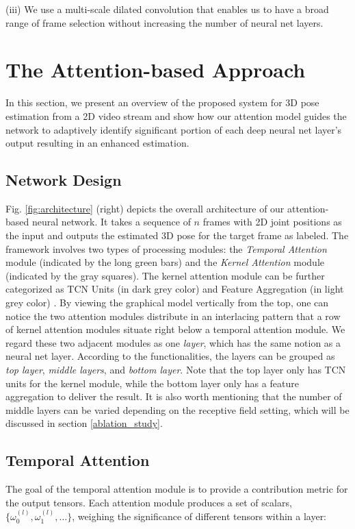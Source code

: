 \documentclass[twocolumn]{svjour3}          \smartqed  \usepackage{graphicx}
\begin{document}
(iii) We use a multi-scale dilated convolution that enables us to have a broad range of frame selection without increasing the number of neural net layers.


\section{The Attention-based Approach} \label{sec:attention}
In this section, we present an overview of the proposed system for 3D pose estimation from a 2D video stream and show how our attention model guides the network to adaptively identify significant portion of each deep neural net layer's output resulting in an enhanced estimation. 


\subsection{Network Design} 
Fig. \ref{fig:architecture} (right) depicts the overall architecture of our attention-based neural network. It takes a sequence of $n$ frames with 2D joint positions as the input and outputs the estimated 3D pose for the target frame as labeled. The framework involves two types of processing modules: the \emph{Temporal Attention} module (indicated by the long green bars) and the \emph{Kernel Attention} module (indicated by the gray squares). The kernel attention module can be further categorized as TCN Units (in dark grey color) and Feature Aggregation (in light grey color) \citep{he2016deep}. By viewing the graphical model vertically from the top, one can notice the two attention modules distribute in an interlacing pattern that a row of kernel attention modules situate right below a temporal attention module. We regard these two adjacent modules as one \emph{layer}, which has the same notion as a neural net layer. According to the functionalities, the layers can be grouped as \emph{top layer}, \emph{middle layers}, and \emph{bottom layer}. Note that the top layer only has TCN units for the kernel module, while the bottom layer only has a feature aggregation to deliver the result. It is also worth mentioning that the number of middle layers can be varied depending on the receptive field setting, which will be discussed in section \ref{ablation_study}.

\subsection{Temporal Attention}\label{units}
The goal of the temporal attention module is to provide a contribution metric for the output tensors. Each attention module produces a set of scalars, $\{\omega_{0}^{(l)}, \omega_{1}^{(l)}, \dots\}$, weighing the significance of different tensors  within a layer:
\end{document}
